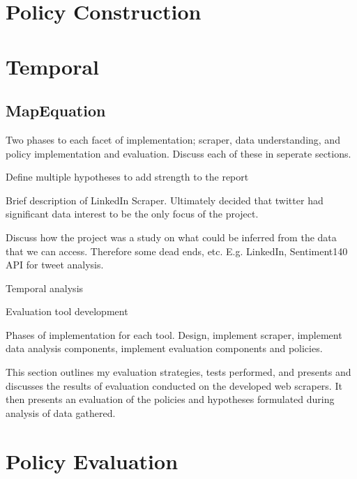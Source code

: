 

\section{Policy Construction}

\section{Temporal}

\subsection{MapEquation}

Two phases to each facet of implementation; scraper, data understanding, and policy implementation and evaluation. Discuss each of these in seperate sections.

Define multiple hypotheses to add strength to the report

Brief description of LinkedIn Scraper. Ultimately decided that twitter had significant data interest to be the only focus of the project.

Discuss how the project was a study on what could be inferred from the data that we can access. Therefore some dead ends, etc. E.g. LinkedIn, Sentiment140 API for tweet analysis. 

Temporal analysis

Evaluation tool development

Phases of implementation for each tool. Design, implement scraper, implement data analysis components, implement evaluation components and policies. 

This section outlines my evaluation strategies, tests performed, and presents and discusses the results of evaluation conducted on the developed web scrapers. It then presents an evaluation of the policies and hypotheses formulated during analysis of data gathered. 






\section{Policy Evaluation}


